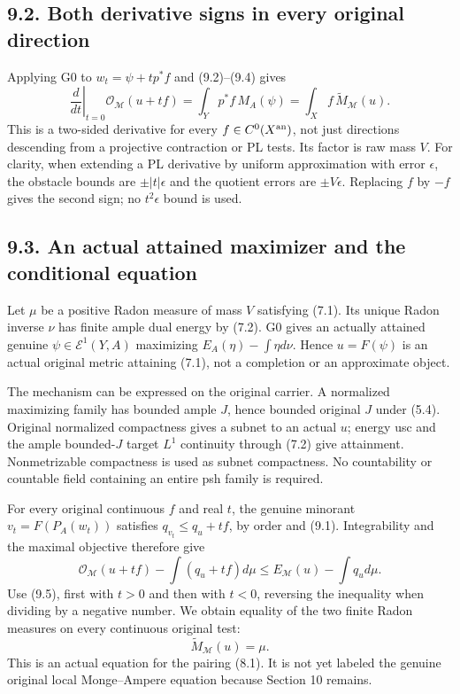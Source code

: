 \documentclass[
  10pt,
]{article}
\begin{document}
\subsection{9.2. Both derivative signs in every original
direction}\label{both-derivative-signs-in-every-original-direction}

Applying G0 to \(w_t=\psi+t p^*f\) and (9.2)--(9.4) gives
\[\left.\frac d{dt}\right|_{t=0}\mathscr O_{\mathcal M}(u+tf)
=\int_Y p^*f\,M_A(\psi)=\int_X f\,\widetilde M_{\mathcal M}(u). \tag{9.5}\]
This is a two-sided derivative for every \(f\in C^0(X^{\rm an})\), not
just directions descending from a projective contraction or PL tests.
Its factor is raw mass \(V\). For clarity, when extending a PL
derivative by uniform approximation with error \(\epsilon\), the
obstacle bounds are \(\pm|t|\epsilon\) and the quotient errors are
\(\pm V\epsilon\). Replacing \(f\) by \(-f\) gives the second sign; no
\(t^2\epsilon\) bound is used.

\subsection{9.3. An actual attained maximizer and the conditional
equation}\label{an-actual-attained-maximizer-and-the-conditional-equation}

Let \(\mu\) be a positive Radon measure of mass \(V\) satisfying (7.1).
Its unique Radon inverse \(\nu\) has finite ample dual energy by (7.2).
G0 gives an actually attained genuine \(\psi\in\mathcal E^1(Y,A)\)
maximizing \(E_A(\eta)-\int\eta d\nu\). Hence \(u=F(\psi)\) is an actual
original metric attaining (7.1), not a completion or an approximate
object.

The mechanism can be expressed on the original carrier. A normalized
maximizing family has bounded ample \(J\), hence bounded original \(J\)
under (5.4). Original normalized compactness gives a subnet to an actual
\(u\); energy usc and the ample bounded-\(J\) target \(L^1\) continuity
through (7.2) give attainment. Nonmetrizable compactness is used as
subnet compactness. No countability or countable field containing an
entire psh family is required.

For every original continuous \(f\) and real \(t\), the genuine minorant
\(v_t=F(P_A(w_t))\) satisfies \(q_{v_t}\leq q_u+tf\), by order and
(9.1). Integrability and the maximal objective therefore give
\[\mathscr O_{\mathcal M}(u+tf)-\int(q_u+tf)d\mu
\leq E_{\mathcal M}(u)-\int q_ud\mu.\] Use (9.5), first with \(t>0\) and
then with \(t<0\), reversing the inequality when dividing by a negative
number. We obtain equality of the two finite Radon measures on every
continuous original test:
\[\widetilde M_{\mathcal M}(u)=\mu.                       \tag{9.6}\]
This is an actual equation for the pairing (8.1). It is not yet labeled
the genuine original local Monge--Ampere equation because Section 10
remains.
\end{document}
